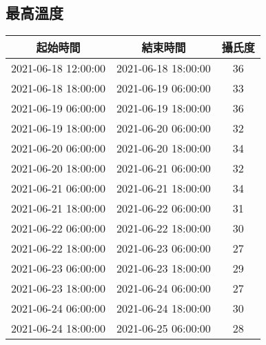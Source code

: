 \documentclass{article}%
\begin{document}
\begin{center}
\section{最高溫度}%
\label{sec:}%
\begin{tabular}{|c|c|c|}%
\hline%
起始時間&結束時間&攝氏度\\%
\hline%
2021{-}06{-}18 12:00:00&2021{-}06{-}18 18:00:00&36\\%
\hline%
2021{-}06{-}18 18:00:00&2021{-}06{-}19 06:00:00&33\\%
\hline%
2021{-}06{-}19 06:00:00&2021{-}06{-}19 18:00:00&36\\%
\hline%
2021{-}06{-}19 18:00:00&2021{-}06{-}20 06:00:00&32\\%
\hline%
2021{-}06{-}20 06:00:00&2021{-}06{-}20 18:00:00&34\\%
\hline%
2021{-}06{-}20 18:00:00&2021{-}06{-}21 06:00:00&32\\%
\hline%
2021{-}06{-}21 06:00:00&2021{-}06{-}21 18:00:00&34\\%
\hline%
2021{-}06{-}21 18:00:00&2021{-}06{-}22 06:00:00&31\\%
\hline%
2021{-}06{-}22 06:00:00&2021{-}06{-}22 18:00:00&30\\%
\hline%
2021{-}06{-}22 18:00:00&2021{-}06{-}23 06:00:00&27\\%
\hline%
2021{-}06{-}23 06:00:00&2021{-}06{-}23 18:00:00&29\\%
\hline%
2021{-}06{-}23 18:00:00&2021{-}06{-}24 06:00:00&27\\%
\hline%
2021{-}06{-}24 06:00:00&2021{-}06{-}24 18:00:00&30\\%
\hline%
2021{-}06{-}24 18:00:00&2021{-}06{-}25 06:00:00&28\\%
\hline%
\end{tabular}

%

\end{center}
\end{document}
